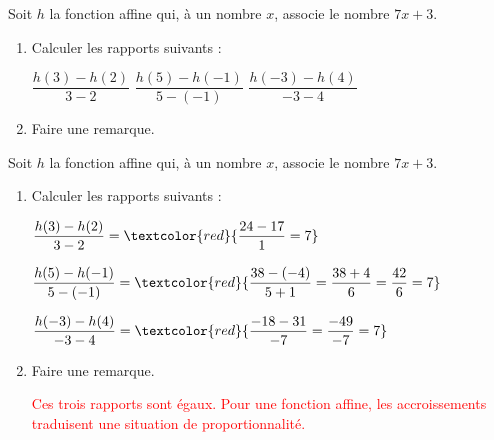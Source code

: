 \begin{exercice*}
    Soit $h$ la fonction affine qui, à un nombre $x$, associe le nombre $7x+3$.
    \begin{enumerate}
        \item Calculer les rapports suivants :
        
        \smallskip
        $\dfrac{h(3)-h(2)}{3-2}$ \hfill $\dfrac{h(5)-h(-1)}{5-(-1)}$ \hfill $\dfrac{h(-3)-h(4)}{-3-4}$
        \item Faire une remarque.
    \end{enumerate}
\end{exercice*}
\begin{corrige}
    Soit $h$ la fonction affine qui, à un nombre $x$, associe le nombre $7x+3$.

    \begin{enumerate}
        \item Calculer les rapports suivants :
        
        \smallskip
        $\dfrac{h(3)-h(2)}{3-2} = \textcolor{red}{\dfrac{24-17}{1}=7}$
        
        \smallskip
        $\dfrac{h(5)-h(-1)}{5-(-1)} = \textcolor{red}{\dfrac{38-(-4)}{5+1}=\dfrac{38+4}{6}=\dfrac{42}{6}=7}$
        
        \smallskip
        $\dfrac{h(-3)-h(4)}{-3-4} = \textcolor{red}{\dfrac{-18-31}{-7}=\dfrac{-49}{-7}=7}$
        \item Faire une remarque.
        
        \textcolor{red}{Ces trois rapports sont égaux. Pour une fonction affine, les accroissements traduisent une situation de proportionnalité.}
    \end{enumerate}
\end{corrige}
